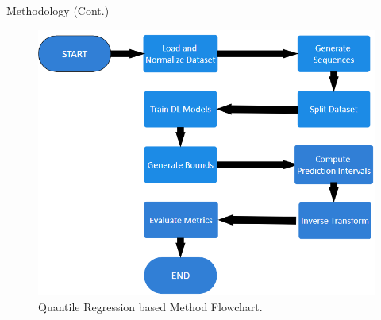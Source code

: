\documentclass[xcolor=dvipsnames,aspectratio=169]{beamer}
\begin{document}
\begin{frame}{Methodology (Cont.)}
\begin{figure}
    \centering
    \includegraphics[width=0.5\linewidth]{QR_based.png}
    \caption{Quantile Regression based Method Flowchart.}
    \label{fig:enter-label}
\end{figure}
\end{frame}
\end{document}
